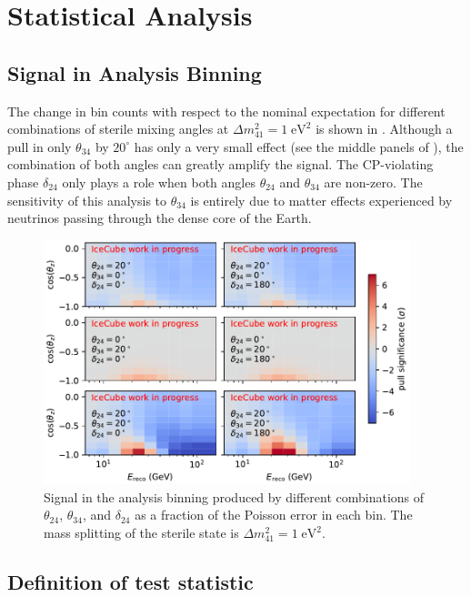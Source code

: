 \section{Statistical Analysis}

\subsection{Signal in Analysis Binning}
The change in bin counts with respect to the nominal expectation for different combinations of sterile mixing angles at $\Delta m^2_{41}=1\;\mathrm{eV^2}$ is shown in .
Although a pull in only $\theta_{34}$ by $20^\circ$ has only a very small effect (see the middle panels of ), the combination of both angles can greatly amplify the signal.
The CP-violating phase $\delta_{24}$ only plays a role when both angles $\theta_{24}$ and $\theta_{34}$ are non-zero.
The sensitivity of this analysis to $\theta_{34}$ is entirely due to matter effects experienced by neutrinos passing through the dense core of the Earth.

\begin{figure}
    \centering
    \includegraphics[width=0.95\textwidth]{figures/measurement/sterile_analysis/oscillation_signal/pull_theta_combinations_20deg_dcp24.pdf}
    \caption{Signal in the analysis binning produced by different combinations of $\theta_{24}$, $\theta_{34}$, and $\delta_{24}$ as a fraction of the Poisson error in each bin. The mass splitting of the sterile state is $\Delta m^2_{41}=1\;\mathrm{eV^2}$.}
    \label{fig:oscillation-effects-ana-binning}
\end{figure}

\subsection{Definition of test statistic}
\label{sec:test-statistic-sterile}

